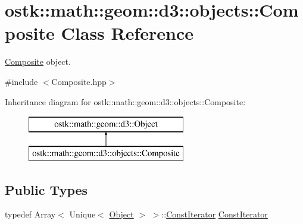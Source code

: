 \hypertarget{classostk_1_1math_1_1geom_1_1d3_1_1objects_1_1_composite}{}\section{ostk\+:\+:math\+:\+:geom\+:\+:d3\+:\+:objects\+:\+:Composite Class Reference}
\label{classostk_1_1math_1_1geom_1_1d3_1_1objects_1_1_composite}


\hyperlink{classostk_1_1math_1_1geom_1_1d3_1_1objects_1_1_composite}{Composite} object.  




{\ttfamily \#include $<$Composite.\+hpp$>$}

Inheritance diagram for ostk\+:\+:math\+:\+:geom\+:\+:d3\+:\+:objects\+:\+:Composite\+:\begin{figure}[H]
\begin{center}
\leavevmode
\includegraphics[height=2.000000cm]{classostk_1_1math_1_1geom_1_1d3_1_1objects_1_1_composite}
\end{center}
\end{figure}
\subsection*{Public Types}
\begin{DoxyCompactItemize}
\item 
typedef Array$<$ Unique$<$ \hyperlink{classostk_1_1math_1_1geom_1_1d3_1_1_object}{Object} $>$ $>$\+::\hyperlink{classostk_1_1math_1_1geom_1_1d3_1_1objects_1_1_composite_ab1f78408fec2e435dc1172cf2675b0a9}{Const\+Iterator} \hyperlink{classostk_1_1math_1_1geom_1_1d3_1_1objects_1_1_composite_ab1f78408fec2e435dc1172cf2675b0a9}{Const\+Iterator}
\end{DoxyCompactItemize}
